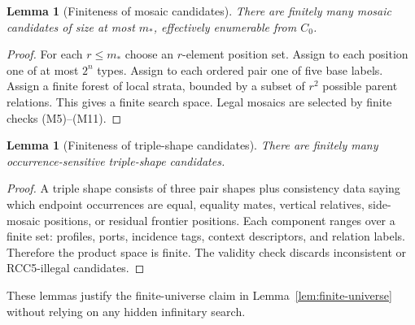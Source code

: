 \documentclass[11pt]{article}
\newtheorem{lemma}[theorem]{Lemma}
\begin{document}
\begin{lemma}[Finiteness of mosaic candidates]
There are finitely many mosaic candidates of size at most $m_*$, effectively enumerable from $C_0$.
\end{lemma}

\begin{proof}
For each $r\le m_*$ choose an $r$-element position set.  Assign to each position one of at most $2^n$ types.  Assign to each ordered pair one of five base labels.  Assign a finite forest of local strata, bounded by a subset of $r^2$ possible parent relations.  This gives a finite search space.  Legal mosaics are selected by finite checks (M5)--(M11).
\end{proof}

\begin{lemma}[Finiteness of triple-shape candidates]
There are finitely many occurrence-sensitive triple-shape candidates.
\end{lemma}

\begin{proof}
A triple shape consists of three pair shapes plus consistency data saying which endpoint occurrences are equal, equality mates, vertical relatives, side-mosaic positions, or residual frontier positions.  Each component ranges over a finite set: profiles, ports, incidence tags, context descriptors, and relation labels.  Therefore the product space is finite.  The validity check discards inconsistent or RCC5-illegal candidates.
\end{proof}

These lemmas justify the finite-universe claim in Lemma~\ref{lem:finite-universe} without relying on any hidden infinitary search.
\end{document}
